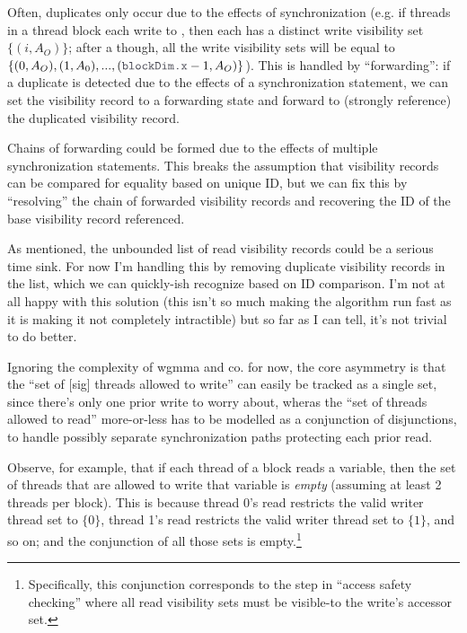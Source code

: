 \filbreak
Often, duplicates only occur due to the effects of synchronization (e.g. if threads in a thread block each write to , then each  has a distinct write visibility set ${\{(i, A_O)\}}$; after a  though, all the write visibility sets will be equal to ${\{(0, A_O), (1, A_0), ... ,(\lighttt{blockDim.x}-1, A_O)\}}$).
This is handled by ``forwarding'': if a duplicate is detected due to the effects of a synchronization statement, we can set the visibility record to a forwarding state and forward to (strongly reference) the duplicated visibility record.

\filbreak
Chains of forwarding could be formed due to the effects of multiple synchronization statements.
This breaks the assumption that visibility records can be compared for equality based on unique ID, but we can fix this by ``resolving'' the chain of forwarded visibility records and recovering the ID of the base visibility record referenced.

\filbreak
{} As mentioned, the unbounded list of read visibility records could be a serious time sink.
For now I'm handling this by removing duplicate visibility records in the list, which we can quickly-ish recognize based on ID comparison.
I'm not at all happy with this solution (this isn't so much making the algorithm run fast as it is making it not completely intractible) but so far as I can tell, it's not trivial to do better.

\filbreak
Ignoring the complexity of wgmma and co. for now, the core asymmetry is that the ``set of [sig] threads allowed to write'' can easily be tracked as a single set, since there's only one prior write to worry about, wheras the ``set of threads allowed to read'' more-or-less has to be modelled as a conjunction of disjunctions, to handle possibly separate synchronization paths protecting each prior read.

\filbreak
Observe, for example, that if each thread of a block reads a variable, then the set of threads that are allowed to write that variable is \textit{empty} (assuming at least 2 threads per block).
This is because thread 0's read restricts the valid writer thread set to $\{0\}$, thread 1's read restricts the valid writer thread set to $\{1\}$, and so on; and the conjunction of all those sets is empty.\footnote{Specifically, this conjunction corresponds to the step in ``access safety checking'' where all read visibility sets must be visible-to the write's accessor set.}

